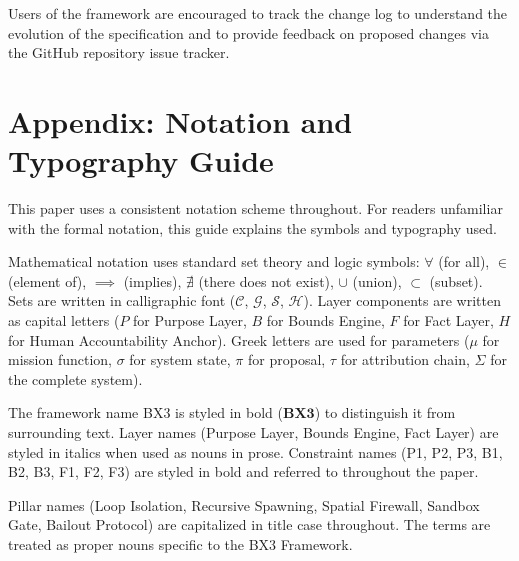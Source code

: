 \documentclass[12pt]{article}
\begin{document}
Users of the framework are encouraged to track the change log to understand the evolution of the specification and to provide feedback on proposed changes via the GitHub repository issue tracker.

\section{Appendix: Notation and Typography Guide}
This paper uses a consistent notation scheme throughout. For readers unfamiliar with the formal notation, this guide explains the symbols and typography used.

Mathematical notation uses standard set theory and logic symbols: $\forall$ (for all), $\in$ (element of), $\implies$ (implies), $\nexists$ (there does not exist), $\cup$ (union), $\subset$ (subset). Sets are written in calligraphic font ($\mathcal{C}$, $\mathcal{G}$, $\mathcal{S}$, $\mathcal{H}$). Layer components are written as capital letters ($P$ for Purpose Layer, $B$ for Bounds Engine, $F$ for Fact Layer, $H$ for Human Accountability Anchor). Greek letters are used for parameters ($\mu$ for mission function, $\sigma$ for system state, $\pi$ for proposal, $\tau$ for attribution chain, $\Sigma$ for the complete system).

The framework name BX3 is styled in bold ($\mathbf{BX3}$) to distinguish it from surrounding text. Layer names (Purpose Layer, Bounds Engine, Fact Layer) are styled in italics when used as nouns in prose. Constraint names (P1, P2, P3, B1, B2, B3, F1, F2, F3) are styled in bold and referred to throughout the paper.

Pillar names (Loop Isolation, Recursive Spawning, Spatial Firewall, Sandbox Gate, Bailout Protocol) are capitalized in title case throughout. The terms are treated as proper nouns specific to the BX3 Framework.



\end{document}
